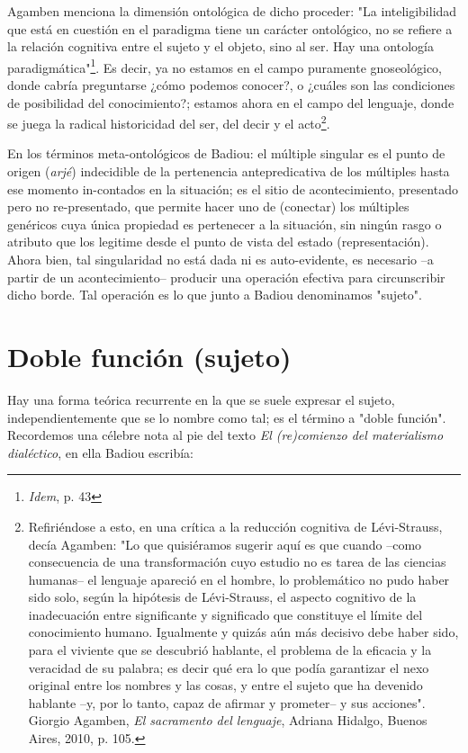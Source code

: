 \documentclass{book}
\begin{document}
Agamben menciona la dimensión ontológica de dicho proceder: "La
inteligibilidad que está en cuestión en el paradigma tiene un carácter
ontológico, no se refiere a la relación cognitiva entre el sujeto y el
objeto, sino al ser. Hay una ontología paradigmática"\footnote{\emph{Idem},
  p. 43}. Es decir, ya no estamos en el campo puramente gnoseológico,
donde cabría preguntarse ¿cómo podemos conocer?, o ¿cuáles son las
condiciones de posibilidad del conocimiento?; estamos ahora en el campo
del lenguaje, donde se juega la radical historicidad del ser, del decir
y el acto\footnote{Refiriéndose a esto, en una crítica a la reducción
  cognitiva de Lévi-Strauss, decía Agamben: "Lo que quisiéramos sugerir
  aquí es que cuando --como consecuencia de una transformación cuyo
  estudio no es tarea de las ciencias humanas-- el lenguaje apareció en
  el hombre, lo problemático no pudo haber sido solo, según la hipótesis
  de Lévi-Strauss, el aspecto cognitivo de la inadecuación entre
  significante y significado que constituye el límite del conocimiento
  humano. Igualmente y quizás aún más decisivo debe haber sido, para el
  viviente que se descubrió hablante, el problema de la eficacia y la
  veracidad de su palabra; es decir qué era lo que podía garantizar el
  nexo original entre los nombres y las cosas, y entre el sujeto que ha
  devenido hablante --y, por lo tanto, capaz de afirmar y prometer-- y
  sus acciones". Giorgio Agamben, \emph{El sacramento del lenguaje},
  Adriana Hidalgo, Buenos Aires, 2010, p. 105.}.

En los términos meta-ontológicos de Badiou: el múltiple singular es el
punto de origen (\emph{arjé}) indecidible de la pertenencia
antepredicativa de los múltiples hasta ese momento in-contados en la
situación; es el sitio de acontecimiento, presentado pero no
re-presentado, que permite hacer uno de (conectar) los múltiples
genéricos cuya única propiedad es pertenecer a la situación, sin ningún
rasgo o atributo que los legitime desde el punto de vista del estado
(representación). Ahora bien, tal singularidad no está dada ni es
auto-evidente, es necesario --a partir de un acontecimiento-- producir
una operación efectiva para circunscribir dicho borde. Tal operación es
lo que junto a Badiou denominamos "sujeto".

\section{Doble función (sujeto)}

Hay una forma teórica recurrente en la que se suele expresar el sujeto,
independientemente que se lo nombre como tal; es el término a "doble
función". Recordemos una célebre nota al pie del texto \emph{El
(re)comienzo del materialismo dialéctico}, en ella Badiou escribía:
\end{document}
